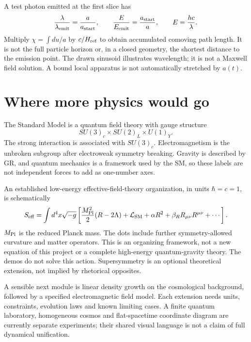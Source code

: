 \documentclass[11pt,a4paper]{article}
\begin{document}
A test photon emitted at the first slice has
\begin{equation}
\frac{\lambda}{\lambda_{\rm emit}}=\frac{a}{a_{\rm start}},\qquad
\frac{E}{E_{\rm emit}}=\frac{a_{\rm start}}{a},\qquad E=\frac{hc}{\lambda}.
\end{equation}
Multiply $\chi=\int du/a$ by $c/H_{\rm ref}$ to obtain accumulated comoving path length. It is not the full particle horizon or, in a closed geometry, the shortest distance to the emission point. The drawn sinusoid illustrates wavelength; it is not a Maxwell field solution. A bound local apparatus is not automatically stretched by $a(t)$.
\section{Where more physics would go}
The Standard Model is a quantum field theory with gauge structure
\begin{equation}SU(3)_c\times SU(2)_L\times U(1)_Y.\end{equation}
The strong interaction is associated with $SU(3)_c$. Electromagnetism is the unbroken subgroup after electroweak symmetry breaking. Gravity is described by GR, and quantum mechanics is a framework used by the SM, so these labels are not independent forces to add as one-number axes.

An established low-energy effective-field-theory organization, in units $\hbar=c=1$, is schematically
\begin{equation}
S_{\rm eff}=\int d^4x\sqrt{-g}\left[
\frac{M_{\rm Pl}^2}{2}(R-2\Lambda)+\mathcal L_{\rm SM}
+\alpha R^2+\beta_R R_{\mu\nu}R^{\mu\nu}+\cdots\right].
\end{equation}
$M_{\rm Pl}$ is the reduced Planck mass. The dots include further symmetry-allowed curvature and matter operators. This is an organizing framework, not a new equation of this project or a complete high-energy quantum-gravity theory. The demos do not solve this action. Supersymmetry is an optional theoretical extension, not implied by rhetorical opposites.

A sensible next module is linear density growth on the cosmological background, followed by a specified electromagnetic field model. Each extension needs units, constraints, evolution laws and known limiting cases. A finite quantum laboratory, homogeneous cosmos and flat-spacetime coordinate diagram are currently separate experiments; their shared visual language is not a claim of full dynamical unification.
\end{document}
